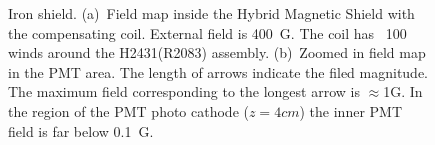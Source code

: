\documentclass[12pt]{article}
\begin{document}
\begin{figure}[ht]%
\centering
{}
\qquad
{}
\caption{\small{Iron shield. 
(a)~Field map inside the Hybrid Magnetic Shield 
with the compensating coil. External field is 400~G.
The coil has ~100 winds around  the H2431(R2083) assembly.
(b)~Zoomed in field map in the PMT area.
The length of arrows indicate the  filed magnitude. 
The maximum field corresponding to the longest arrow  is $\approx$1G.
In the region of the  PMT photo cathode ($z=4cm$)  the inner PMT field is far below 0.1~G.}
\label{VBT3CYUS2}}
\end{figure}
\end{document}
